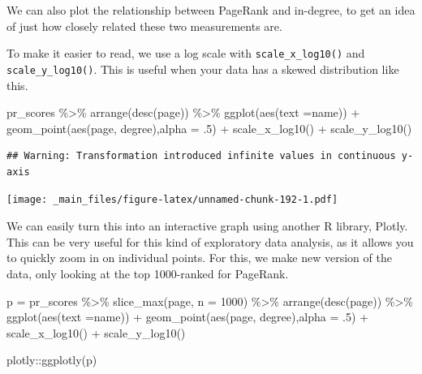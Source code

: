 \documentclass[
]{book}
\newenvironment{Shaded}{\begin{snugshade}}{\end{snugshade}}
\newcommand{\AttributeTok}[1]{\textcolor[rgb]{0.77,0.63,0.00}{#1}}
\newcommand{\DecValTok}[1]{\textcolor[rgb]{0.00,0.00,0.81}{#1}}
\newcommand{\FunctionTok}[1]{\textcolor[rgb]{0.00,0.00,0.00}{#1}}
\newcommand{\NormalTok}[1]{#1}
\newcommand{\OtherTok}[1]{\textcolor[rgb]{0.56,0.35,0.01}{#1}}
\newcommand{\SpecialCharTok}[1]{\textcolor[rgb]{0.00,0.00,0.00}{#1}}
\begin{document}
We can also plot the relationship between PageRank and in-degree, to get an idea of just how closely related these two measurements are.

To make it easier to read, we use a log scale with \texttt{scale\_x\_log10()} and \texttt{scale\_y\_log10()}. This is useful when your data has a skewed distribution like this.

\begin{Shaded}
\begin{Highlighting}[]
\NormalTok{pr\_scores }\SpecialCharTok{\%\textgreater{}\%} 
  \FunctionTok{arrange}\NormalTok{(}\FunctionTok{desc}\NormalTok{(page))  }\SpecialCharTok{\%\textgreater{}\%} 
  \FunctionTok{ggplot}\NormalTok{(}\FunctionTok{aes}\NormalTok{(}\AttributeTok{text =}\NormalTok{name)) }\SpecialCharTok{+} 
  \FunctionTok{geom\_point}\NormalTok{(}\FunctionTok{aes}\NormalTok{(page, degree),}\AttributeTok{alpha =}\NormalTok{ .}\DecValTok{5}\NormalTok{) }\SpecialCharTok{+} \FunctionTok{scale\_x\_log10}\NormalTok{() }\SpecialCharTok{+} \FunctionTok{scale\_y\_log10}\NormalTok{()}
\end{Highlighting}
\end{Shaded}

\begin{verbatim}
## Warning: Transformation introduced infinite values in continuous y-axis
\end{verbatim}

\texttt{[image: \_main\_files/figure-latex/unnamed-chunk-192-1.pdf]}

We can easily turn this into an interactive graph using another R library, Plotly. This can be very useful for this kind of exploratory data analysis, as it allows you to quickly zoom in on individual points. For this, we make new version of the data, only looking at the top 1000-ranked for PageRank.

\begin{Shaded}
\begin{Highlighting}[]
\NormalTok{p }\OtherTok{=}\NormalTok{ pr\_scores }\SpecialCharTok{\%\textgreater{}\%} \FunctionTok{slice\_max}\NormalTok{(page, }\AttributeTok{n =} \DecValTok{1000}\NormalTok{) }\SpecialCharTok{\%\textgreater{}\%} 
  \FunctionTok{arrange}\NormalTok{(}\FunctionTok{desc}\NormalTok{(page))  }\SpecialCharTok{\%\textgreater{}\%} 
  \FunctionTok{ggplot}\NormalTok{(}\FunctionTok{aes}\NormalTok{(}\AttributeTok{text =}\NormalTok{name)) }\SpecialCharTok{+} 
  \FunctionTok{geom\_point}\NormalTok{(}\FunctionTok{aes}\NormalTok{(page, degree),}\AttributeTok{alpha =}\NormalTok{ .}\DecValTok{5}\NormalTok{) }\SpecialCharTok{+} \FunctionTok{scale\_x\_log10}\NormalTok{() }\SpecialCharTok{+} \FunctionTok{scale\_y\_log10}\NormalTok{()}

\NormalTok{plotly}\SpecialCharTok{::}\FunctionTok{ggplotly}\NormalTok{(p)}
\end{Highlighting}
\end{Shaded}
\end{document}
